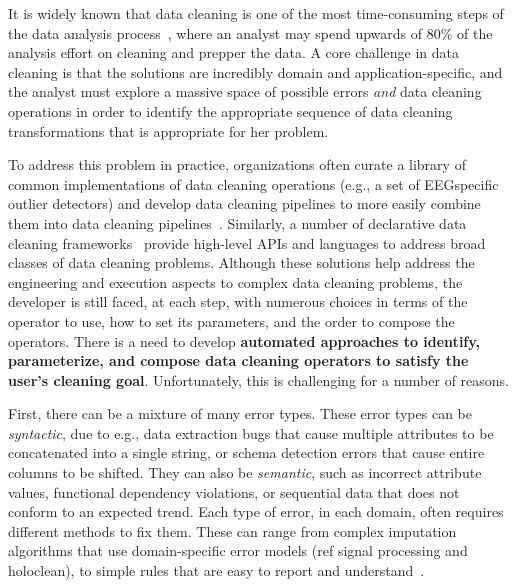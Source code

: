 It is widely known that data cleaning is one of the most time-consuming steps of the data analysis process~\cite{nytimes}, where an analyst may spend upwards of 80\% of the analysis effort on cleaning and prepper the data.  A core challenge in data cleaning is that the solutions are incredibly domain and application-specific, and the analyst must explore a massive space of possible errors {\it and} data cleaning operations in order to identify the appropriate sequence of data cleaning transformations that is appropriate for her problem.


To address this problem in practice, organizations often curate a library of common implementations of data cleaning operations (e.g., a set of EEGspecific outlier detectors) and develop data cleaning pipelines to more easily combine them into data cleaning pipelines~\cite{krishnan2016hilda}.  Similarly, a number of declarative data cleaning frameworks~\cite{DBLP:journals/pvldb/HaasKWF015,gokhale2014corleone,stonebraker2013data,giannakopoulou2017cleanm} provide high-level APIs and languages to address broad classes of data cleaning problems.  Although these solutions help address the engineering and execution aspects to complex data cleaning problems, the developer is still faced, at each step, with numerous choices in terms of the operator to use, how to set its parameters, and the order to compose the operators.  There is a need to develop \textbf{automated approaches to identify, parameterize, and compose data cleaning operators to satisfy the user's cleaning goal}.  Unfortunately, this is challenging for a number of reasons.




First, there can be a mixture of many error types.    These error types can be {\it syntactic}, due to e.g., data extraction bugs that cause multiple attributes to be concatenated into a single string, or schema detection errors that cause entire columns to be shifted.  They can also be {\it semantic}, such as incorrect attribute values, functional dependency violations, or sequential data that does not conform to an expected trend.   Each type of error, in each domain, often requires different methods to fix them.  These can range from complex imputation algorithms that use domain-specific error models (ref signal processing and holoclean), to simple rules that are easy to report and understand~\cite{}.  

